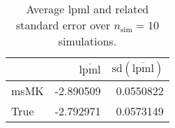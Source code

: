 \begin{table}[H]

\caption{Average lpml and related standard error over $n_{\text{sim}} = 10$ simulations.}
\centering
\begin{tabular}[t]{lrr}
\toprule
  & $\overbar{\text{lpml}}$ & $\text{sd}(\overbar{\text{lpml}})$\\
\midrule
msMK & -2.890509 & 0.0550822\\
True & -2.792971 & 0.0573149\\
\bottomrule
\end{tabular}
\end{table}